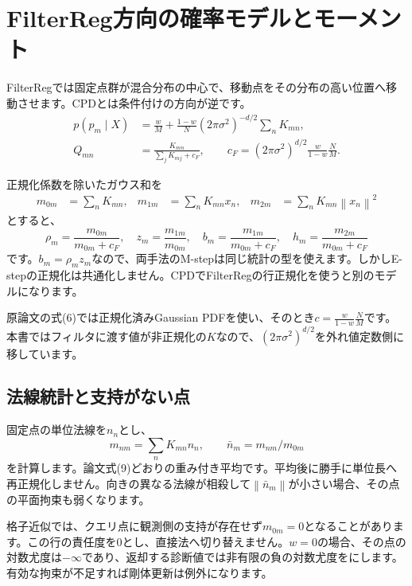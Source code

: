 \documentclass[a4paper,11pt]{article}
\newcommand{\code}[1]{\texttt{\detokenize{#1}}}
\newcommand{\norm}[1]{\left\lVert#1\right\rVert}
\numberwithin{equation}{section}
\begin{document}
\section{FilterReg方向の確率モデルとモーメント}\label{sec:filterreg}
FilterRegでは固定点群が混合分布の中心で、移動点をその分布の高い位置へ移動させます。CPDとは条件付けの方向が逆です。\cite[§3.1--3.2]{fr}
\begin{align}
 p(p_m\mid X)&=\frac wM+\frac{1-w}{N}(2\pi\sigma^2)^{-d/2}\sum_nK_{mn},\\
 Q_{mn}&=\frac{K_{mn}}{\sum_jK_{mj}+c_F},\qquad
 c_F=(2\pi\sigma^2)^{d/2}\frac w{1-w}\frac NM.
\end{align}

正規化係数を除いたガウス和を
\begin{align}
 m_{0m}&=\sum_n K_{mn},&
 m_{1m}&=\sum_n K_{mn}x_n,&
 m_{2m}&=\sum_n K_{mn}\norm{x_n}^2
\end{align}
とすると、
\begin{equation}
 \rho_m=\frac{m_{0m}}{m_{0m}+c_F},\quad
 z_m=\frac{m_{1m}}{m_{0m}},\quad
 b_m=\frac{m_{1m}}{m_{0m}+c_F},\quad
 h_m=\frac{m_{2m}}{m_{0m}+c_F}
\end{equation}
です。\(b_m=\rho_mz_m\)なので、両手法のM-stepは同じ統計の型を使えます。しかしE-stepの正規化は共通化しません。CPDでFilterRegの行正規化を使うと別のモデルになります。

原論文の式(6)では正規化済みGaussian PDFを使い、そのとき\(c=\frac w{1-w}\frac NM\)です。本書ではフィルタに渡す値が非正規化の\(K\)なので、\((2\pi\sigma^2)^{d/2}\)を外れ値定数側に移しています。\cite{fr}

\subsection{法線統計と支持がない点}
固定点の単位法線を\(n_n\)とし、
\begin{equation}
 m_{nm}=\sum_nK_{mn}n_n,\qquad \bar n_m=m_{nm}/m_{0m}
\end{equation}
を計算します。論文式(9)どおりの重み付き平均です。平均後に勝手に単位長へ再正規化しません。向きの異なる法線が相殺して\(\norm{\bar n_m}\)が小さい場合、その点の平面拘束も弱くなります。

格子近似では、クエリ点に観測側の支持が存在せず\(m_{0m}=0\)となることがあります。この行の責任度を0とし、直接法へ切り替えません。\(w=0\)の場合、その点の対数尤度は\(-\infty\)であり、返却する診断値では非有限の負の対数尤度を\code{None}にします。有効な拘束が不足すれば剛体更新は例外になります。
\end{document}

